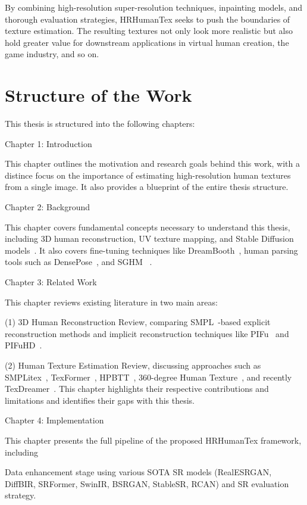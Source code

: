 By combining high-resolution super-resolution techniques, inpainting models, and thorough evaluation strategies, HRHumanTex seeks to push the boundaries of texture estimation. The resulting textures not only look more realistic but also hold greater value for downstream applications in virtual human creation, the game industry, and so on.

\section{Structure of the Work}

This thesis is structured into the following chapters:

Chapter 1: Introduction

This chapter outlines the motivation and research goals behind this work, with a distince focus on the importance of estimating high-resolution human textures from a single image. It also provides a blueprint of the entire thesis structure.

Chapter 2: Background

This chapter covers fundamental concepts necessary to understand this thesis, including 3D human reconstruction, UV texture mapping, and Stable Diffusion models~\cite{rombach2021highresolution}. It also covers fine-tuning techniques like  DreamBooth~\cite{ruiz2023dreamboothfinetuningtexttoimage}, human parsing tools such as DensePose~\cite{wu2019detectron2}, and \ac{SGHM} ~\cite{chen2022sghm}.

Chapter 3: Related Work

This chapter reviews existing literature in two main areas:

(1) 3D Human Reconstruction Review, comparing SMPL~\cite{SMPL:2015}-based explicit reconstruction methods and implicit reconstruction techniques like PIFu~\cite{saito2019pifu} and PIFuHD~\cite{saito2020pifuhd}.

(2) Human Texture Estimation Review, discussing approaches such as SMPLitex~\cite{casas2023smplitex}, TexFormer~\cite{xu2021texformer}, HPBTT~\cite{zhao2020human}, 360-degree Human Texture~\cite{lazova2019360}, and recently TexDreamer~\cite{liu2024texdreamer}. This chapter highlights their respective contributions and limitations and identifies their gaps with this thesis.

Chapter 4: Implementation

This chapter presents the full pipeline of the proposed HRHumanTex framework, including

Data enhancement stage using various \ac{SOTA} \ac{SR} models (RealESRGAN, DiffBIR, SRFormer, SwinIR, BSRGAN, StableSR, RCAN) and \ac{SR} evaluation strategy.

